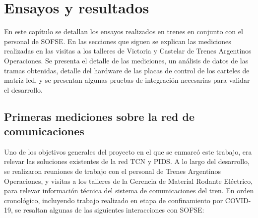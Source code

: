 
\chapter{Ensayos y resultados} %
En este capítulo se detallan los ensayos realizados en trenes en conjunto con el personal de SOFSE. En las secciones que siguen se explican las mediciones realizadas en las visitas a los talleres de Victoria y Castelar de Trenes Argentinos Operaciones. Se presenta el detalle de las mediciones, un análisis de datos de las tramas obtenidas, detalle del hardware de las placas de control de los carteles de matriz led, y se presentan algunas pruebas de integración necesarias para validar el desarrollo. \\


\label{Chapter4} %


\section{Primeras mediciones sobre la red de comunicaciones}

Uno de los objetivos generales del proyecto en el que se enmarcó este trabajo, era relevar las soluciones existentes de la red TCN y PIDS. A lo largo del desarrollo, se realizaron reuniones de trabajo con el personal de Trenes Argentinos Operaciones, y visitas a los talleres de la Gerencia de Material Rodante Eléctrico,  para relevar información técnica del sistema de comunicaciones del tren. En orden cronológico, incluyendo trabajo realizado en etapa de confinamiento por COVID-19, se resaltan algunas de las siguientes interacciones con SOFSE:\\


